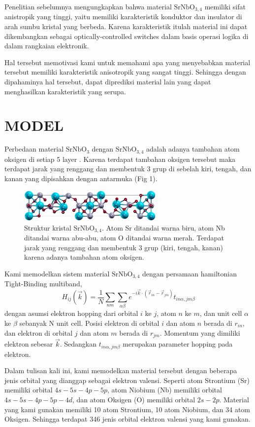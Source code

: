 \documentclass{aip-cp}
\begin{document}
Penelitian sebelumnya mengungkapkan bahwa material $\mathrm{SrNbO_{3,4}}$ memiliki sifat anistropik yang tinggi, yaitu memiliki karakteristik konduktor dan insulator di arah sumbu kristal yang berbeda\cite{andrivo}. Karena karakteristik itulah material ini dapat dikembangkan sebagai optically-controlled switches dalam basis operasi logika di dalam rangkaian elektronik.

Hal tersebut memotivasi kami untuk memahami apa yang menyebabkan material tersebut memiliki karakteristik anisotropik yang sangat tinggi. Sehingga dengan dipahaminya hal tersebut, dapat diprediksi material lain yang dapat menghasilkan karakteristik yang serupa.

\section{MODEL}
Perbedaan material $\mathrm{SrNbO_{3}}$ dengan $\mathrm{SrNbO_{3,4}}$ adalah adanya tambahan atom oksigen di setiap 5 layer \cite{Wan2017}. Karena terdapat tambahan oksigen tersebut maka terdapat jarak yang renggang dan membentuk 3 grup di sebelah kiri, tengah, dan kanan yang dipisahkan dengan antarmuka (Fig 1).

\begin{figure}[b]
  \centerline{\includegraphics[width=200pt]{graph/pwi2xsf.png}}
  \caption{Struktur kristal $\mathrm{SrNbO_{3,4}}$. Atom Sr ditandai warna biru, atom Nb ditandai warna abu-abu, atom O ditandai warna merah. Terdapat jarak yang renggang dan membentuk 3 grup (kiri, tengah, kanan) karena adanya tambahan atom oksigen.}
\end{figure}

Kami memodelkan sistem material $\mathrm{SrNbO_{3,4}}$ dengan persamaan hamiltonian Tight-Binding multiband,
$$ H_{ij}(\vec{k}) = \frac{1}{N}\sum_{nm}\sum_{\alpha \beta}e^{-i\vec{k} \cdot (\vec{r}_{in}-\vec{r}_{jm})} t_{in\alpha, jm\beta} $$
dengan asumsi elektron hopping dari orbital $i$ ke $j$, atom $n$ ke $m$, dan unit cell $\alpha$ ke $\beta$ sebanyak N unit cell. Posisi elektron di orbital $i$ dan atom $n$ berada di $r_{in}$, dan elektron di orbital $j$ dan atom $m$ berada di $r_{jm}$. Momentum yang dimiliki elektron sebesar $\vec{k}$. Sedangkan $t_{in\alpha, jm\beta}$ merupakan parameter hopping pada elektron.

Dalam tulisan kali ini, kami memodelkan material tersebut dengan beberapa jenis orbital yang dianggap sebagai elektron valensi. Seperti atom Strontium (Sr) memiliki orbital $4s-5s-4p-5p$, atom Niobium (Nb) memiliki orbital $4s-5s-4p-5p-4d$, dan atom Oksigen (O) memiliki orbital $2s-2p$. Material yang kami gunakan memiliki 10 atom Strontium, 10 atom Niobium, dan 34 atom Oksigen\cite{persson}. Sehingga terdapat 346 jenis orbital elektron valensi yang kami gunakan.
\end{document}
